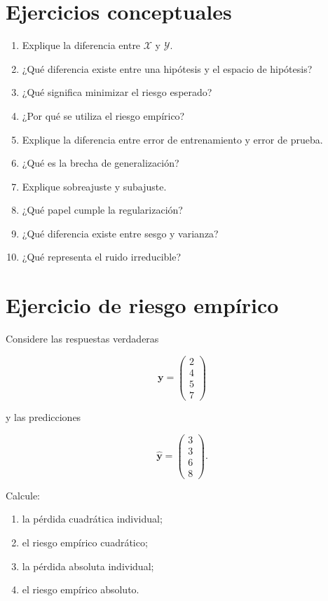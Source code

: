 \documentclass[
  spanish,
  11pt,
  letterpaper,
  DIV=11,
  numbers=noendperiod]{scrreprt}
\providecommand{\tightlist}{%
  \setlength{\itemsep}{0pt}\setlength{\parskip}{0pt}}
\theoremstyle{definition}
\theoremstyle{plain}
\theoremstyle{definition}
\theoremstyle{remark}
\begin{document}
\section{Ejercicios conceptuales}\label{ejercicios-conceptuales-4}

\begin{enumerate}
\def\labelenumi{\arabic{enumi}.}
\tightlist
\item
  Explique la diferencia entre \(\mathcal{X}\) y \(\mathcal{Y}\).
\item
  ¿Qué diferencia existe entre una hipótesis y el espacio de hipótesis?
\item
  ¿Qué significa minimizar el riesgo esperado?
\item
  ¿Por qué se utiliza el riesgo empírico?
\item
  Explique la diferencia entre error de entrenamiento y error de prueba.
\item
  ¿Qué es la brecha de generalización?
\item
  Explique sobreajuste y subajuste.
\item
  ¿Qué papel cumple la regularización?
\item
  ¿Qué diferencia existe entre sesgo y varianza?
\item
  ¿Qué representa el ruido irreducible?
\end{enumerate}

\section{Ejercicio de riesgo
empírico}\label{ejercicio-de-riesgo-empuxedrico}

Considere las respuestas verdaderas

\[
\mathbf{y}
=
\begin{pmatrix}
2\\
4\\
5\\
7
\end{pmatrix}
\]

y las predicciones

\[
\widehat{\mathbf{y}}
=
\begin{pmatrix}
3\\
3\\
6\\
8
\end{pmatrix}.
\]

Calcule:

\begin{enumerate}
\def\labelenumi{\arabic{enumi}.}
\tightlist
\item
  la pérdida cuadrática individual;
\item
  el riesgo empírico cuadrático;
\item
  la pérdida absoluta individual;
\item
  el riesgo empírico absoluto.
\end{enumerate}
\end{document}
